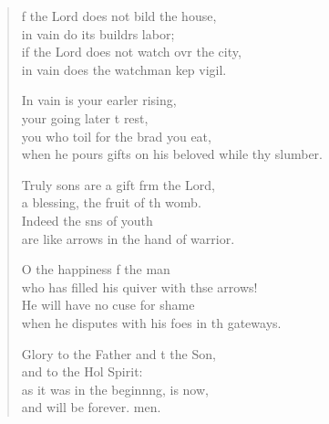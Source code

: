 \settowidth{\versewidth}{when he pours gifts on his beloved while they slumber.}
\begin{verse}%
  \begin{patverse}
f the Lord does not bild the house,\Med\\
in vain do its buildrs labor;\\
if the Lord does not watch ovr the city,\Med\\
in vain does the watchman kep vigil.

In vain is your earl\pointup{\i}er rising,\Med\\
your going later t rest,\\
you who toil for the brad you eat,\Med\\
when he pours gifts on his beloved while thy slumber.

Truly sons are a gift frm the Lord,\Med\\
a blessing, the fruit of th womb.\\
Indeed the sns of youth\Med\\
are like arrows in the hand of  warrior.

O the happiness f the man\Med\\
who has filled his quiver with thse arrows!\\
He will have no cuse for shame\Med\\
when he disputes with his foes in th gateways.

Glory to the Father and t the Son,\Med\\
and to the Hol Spirit:\\
as it was in the beginn\pointup{\i}ng, is now,\Med\\
and will be forever. men. 
  \end{patverse}
\end{verse}

